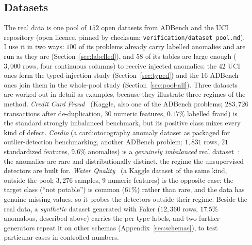 \documentclass[conference]{IEEEtran}
\begin{document}
\subsection{Datasets}
The real data is one pool of $152$ open datasets from ADBench and the UCI repository
(open licence, pinned by checksum; \texttt{verification/dataset\_pool.md}). I use it in two
ways: $100$ of its problems already carry labelled anomalies and are run as they are
(Section~\ref{sec:labelled}), and $58$ of its tables are large enough ($3{,}000$ rows, four
continuous columns) to receive injected anomalies: the $42$ UCI ones form the typed-injection
study (Section~\ref{sec:typed}) and the $16$ ADBench ones join them in the whole-pool study
(Section~\ref{sec:pool-all}). Three datasets
are worked out in detail as examples, because they illustrate three regimes of the method.
\emph{Credit Card Fraud}~\cite{mlgulbcredit}
(Kaggle, also one of the ADBench problems;
$283{,}726$ transactions after de-duplication, $30$ numeric features,
$0.17\%$ labelled fraud) is the standard strongly imbalanced benchmark,
but its positive class mixes every kind of defect.
\emph{Cardio} (a cardiotocography anomaly dataset as packaged for
outlier-detection benchmarking, another ADBench problem; $1{,}831$ rows, $21$ standardized
features, $9.6\%$ anomalies) is a \emph{genuinely imbalanced} real
dataset~\cite{han2022adbench,campos2000cardio}: the anomalies are rare and distributionally
distinct, the regime the unsupervised detectors are built for.
\emph{Water Quality}~\cite{kadiwal2021water} (a Kaggle dataset of the same kind, outside the pool;
$3{,}276$ samples,
$9$ numeric features) is the opposite case: the target class
(``not potable'') is common ($61\%$) rather than rare, and the data has genuine missing values,
so it probes the detectors outside their regime.
Beside the real data, a \emph{synthetic} dataset generated with Faker
($12{,}360$ rows, $17.5\%$ anomalous, described above) carries the per-type
labels, and two further generators repeat it on other schemas
(Appendix~\ref{sec:schemas}), to test particular cases in controlled numbers.
\end{document}
